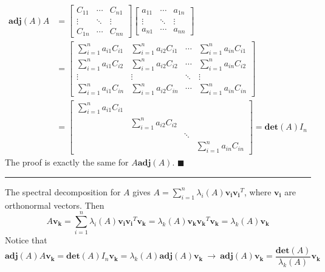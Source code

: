 \documentclass[11pt]{article}
\begin{document}
\begin{equation}
\begin{aligned}
    \bm{adj}(A)A &= \begin{bmatrix}
        C_{11} & \cdots & C_{n1} \\ 
        \vdots & \ddots & \vdots \\
        C_{1n} & \cdots & C_{nn} \end{bmatrix} \begin{bmatrix}
            a_{11} & \cdots & a_{1n} \\
            \vdots & \ddots & \vdots \\
            a_{n1} & \cdots & a_{nn} \end{bmatrix}\\ &= \begin{bmatrix}
                \sum_{i=1}^na_{i1}C_{i1} & \sum_{i=1}^n a_{i2}C_{i1} & \cdots & \sum_{i=1}^n a_{in}C_{i1}\\
                \sum_{i=1}^n a_{i1}C_{i2} & \sum_{i=1}^n a_{i2}C_{i2} & \cdots & \sum_{i=1}^n a_{in}C_{i2}\\
                \vdots & \vdots & \ddots & \vdots \\
                \sum_{i=1}^n a_{i1}C_{in} & \sum_{i=1}^n a_{i2}C_{in} & \cdots & \sum_{i=1}^n a_{in}C_{in}
            \end{bmatrix} \\ &= \begin{bmatrix} \sum_{i=1}^na_{i1}C_{i1} & & & \\ & \sum_{i=1}^na_{i2}C_{i2} & & \\
                & & \ddots & \\ & & & \sum_{i=1}^na_{in}C_{in} \end{bmatrix} = \bm{det}(A)I_n
        \end{aligned}
\end{equation}
The proof is exactly the same for $A\bm{adj}(A)$. \hfill $\blacksquare$ 
\rule{\textwidth}{0.30mm}
The spectral decomposition for $A$ gives $A = \sum_{i=1}^n \lambda_i(A) \bm{v_i}\bm{v_i}^T$, where $\bm{v_i}$ are orthonormal vectors. Then
\begin{equation}
    A\bm{v_k} = \sum_{i=1}^n \lambda_i(A) \bm{v_i}\bm{v_i}^T \bm{v_k} = \lambda_k(A) \bm{v_k}\bm{v_k}^T \bm{v_k} = \lambda_k(A)\bm{v_k}
\end{equation}
Notice that
\begin{equation}
    \bm{adj}(A)A\bm{v_k} = \bm{det}(A)I_n \bm{v_k} = \lambda_k(A) \bm{adj}(A)\bm{v_k} ~\rightarrow~\bm{adj}(A)\bm{v_k} = \frac{\bm{det}(A)}{\lambda_k(A)}\bm{v_k}
\end{equation}
\end{document}

